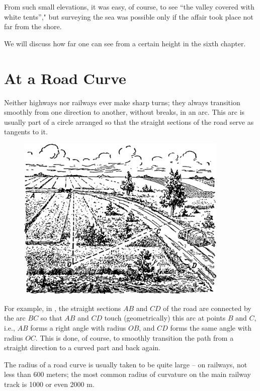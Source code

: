 From such small elevations, it was easy, of course, to see ``the valley covered with white tents''," but surveying the sea was possible only if the affair took place not far from the shore.

We will discuss how far one can see from a certain height in the sixth chapter.


\section{At a Road Curve}
\label{sec-4.6}

Neither highways nor railways ever make sharp turns; they always transition smoothly from one direction to another, without breaks, in an arc. This arc is usually part of a circle arranged so that the straight sections of the road serve as tangents to it. 

\begin{figure}[h!]
\centering
\includegraphics[width=0.9\textwidth]{figures/ch-04/fig-083.pdf}
\end{figure}

For example, in , the straight sections $AB$ and $CD$ of the road are connected by the arc $BC$ so that $AB$ and $CD$ touch (geometrically) this arc at points $B$ and $C$, i.e., $AB$ forms a right angle with radius $OB$, and $CD$ forms the same angle with radius $OC$. This is done, of course, to smoothly transition the path from a straight direction to a curved part and back again.

The radius of a road curve is usually taken to be quite large -- on railways, not less than 600 meters; the most common radius of curvature on the main railway track is 1000 or even 2000 m.




